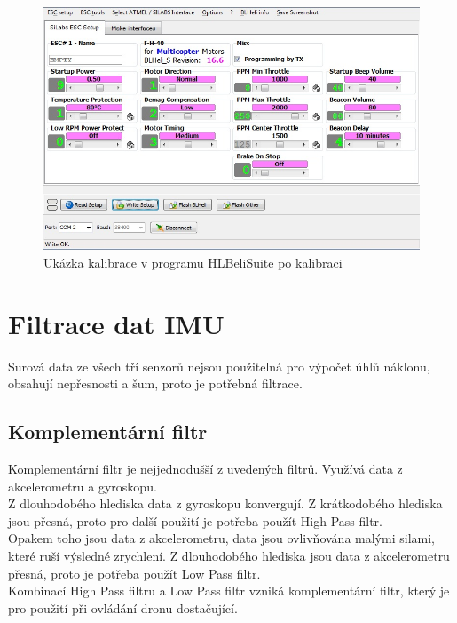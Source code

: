 \begin{figure}[H]
	\centering
	\includegraphics[width=12cm]{pictures/esc_calib6.jpg}
	\caption{Ukázka kalibrace v programu HLBeliSuite po kalibraci}
\end{figure}

\section{Filtrace dat IMU}

%
%


Surová data ze všech tří senzorů nejsou použitelná pro výpočet úhlů náklonu, obsahují nepřesnosti a šum, proto je potřebná filtrace.\\


\subsection{Komplementární filtr}
Komplementární filtr je nejjednodušší z uvedených filtrů. Využívá data z akcelerometru a gyroskopu. \\
Z dlouhodobého hlediska data z gyroskopu konvergují. Z krátkodobého hlediska jsou přesná, proto pro další použití je potřeba použít High Pass filtr.\\
Opakem toho jsou data z akcelerometru, data jsou ovlivňována malými silami, které ruší výsledné zrychlení. Z dlouhodobého hlediska jsou data z akcelerometru přesná, proto je potřeba použít Low Pass filtr.\\
Kombinací High Pass filtru a Low Pass filtr vzniká komplementární filtr, který je pro použití při ovládání dronu dostačující.\\


